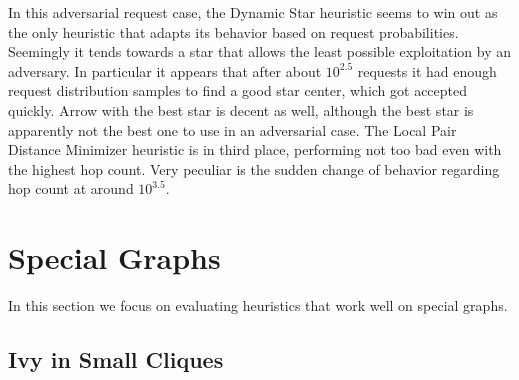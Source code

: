\documentclass[a4paper, oneside]{discothesis}
\begin{document}

In this adversarial request case, the Dynamic Star heuristic seems to win out as the only heuristic that adapts its behavior based on request probabilities. Seemingly it tends towards a star that allows the least possible exploitation by an adversary. In particular it appears that after about $10^{2.5}$ requests it had enough request distribution samples to find a good star center, which got accepted quickly. Arrow with the best star is decent as well, although the best star is apparently not the best one to use in an adversarial case. The Local Pair Distance Minimizer heuristic is in third place, performing not too bad even with the highest hop count. Very peculiar is the sudden change of behavior regarding hop count at around $10^{3.5}$.

\section{Special Graphs}

In this section we focus on evaluating heuristics that work well on special graphs.

\subsection{Ivy in Small Cliques}
\label{result:clique}
\end{document}
